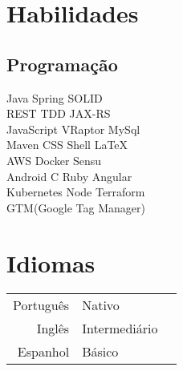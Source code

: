 \documentclass[]{deedy-resume-openfont}
\begin{document}
\begin{minipage}[t]{0.33\textwidth}

\sectionsep


\section{Habilidades}
\subsection{Programação}
Java \textbullet{} Spring \textbullet{} SOLID \\
REST \textbullet{} TDD \textbullet{} JAX-RS \\
JavaScript \textbullet{} VRaptor \textbullet{} MySql\\ 
Maven \textbullet{} CSS \textbullet{} Shell \textbullet{} \LaTeX\ \\
AWS \textbullet{} Docker \textbullet{} Sensu \\
Android \textbullet{} C \textbullet{} Ruby \textbullet{} Angular \\ 
Kubernetes \textbullet{} Node \textbullet{} Terraform \\
GTM(Google Tag Manager) \\
\sectionsep


\section{Idiomas} 
\begin{tabular}{rll}
Português	    & Nativo\\
Inglês	     	& Intermediário\\
Espanhol		& Básico\\ 
\end{tabular}
\sectionsep

%
%

\end{minipage} 
\hfill
\end{document}

